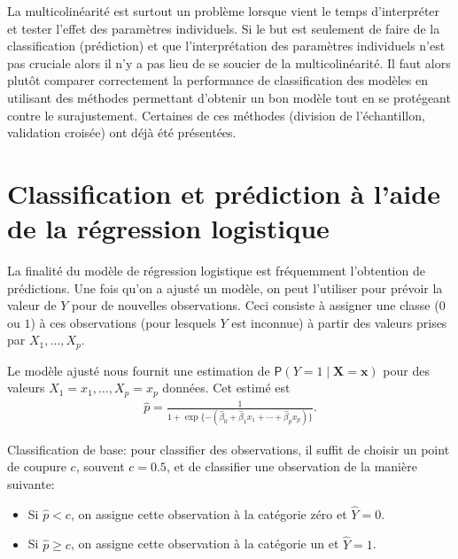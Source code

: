 \documentclass[
  11pt,
  letterpaper,
]{book}
\providecommand{\tightlist}{%
  \setlength{\itemsep}{0pt}\setlength{\parskip}{0pt}}
\theoremstyle{definition}
\theoremstyle{definition}
\theoremstyle{definition}
\theoremstyle{definition}
\theoremstyle{remark}
\begin{document}
La multicolinéarité est surtout un problème lorsque vient le temps d'interpréter et tester l'effet des paramètres individuels. Si le but est seulement de faire de la classification (prédiction) et que l'interprétation des paramètres individuels n'est pas cruciale alors il n'y a pas lieu de se soucier de la multicolinéarité. Il faut alors plutôt comparer correctement la performance de classification des modèles en utilisant des méthodes permettant d'obtenir un bon modèle tout en se protégeant contre le surajustement. Certaines de ces méthodes (division de l'échantillon, validation croisée) ont déjà été présentées.

\hypertarget{classification-et-pruxe9diction-uxe0-laide-de-la-ruxe9gression-logistique}{%
\section{Classification et prédiction à l'aide de la régression logistique}\label{classification-et-pruxe9diction-uxe0-laide-de-la-ruxe9gression-logistique}}

La finalité du modèle de régression logistique est fréquemment l'obtention de prédictions. Une fois qu'on a ajusté un modèle, on peut l'utiliser pour prévoir la valeur de \(Y\) pour de nouvelles observations. Ceci consiste à assigner une classe (\(0\) ou \(1\)) à ces observations (pour lesquels \(Y\) est inconnue) à partir des valeurs prises par \(X_1, \ldots, X_p\).

Le modèle ajusté nous fournit une estimation de \({\mathsf P}\left(Y=1 \mid \boldsymbol{X}=\boldsymbol{x}\right)\) pour des valeurs \(X_1=x_1, \ldots, X_p=x_p\) données. Cet estimé est
\begin{align*}
 \widehat{p} = \frac{1}{1+ \exp\{- ( \widehat{\beta}_0 + \widehat{\beta}_1x_1 + \cdots + \widehat{\beta}_p x_p)\}}.
\end{align*}

Classification de base: pour classifier des observations, il suffit de choisir un point de coupure \(c\), souvent \(c=0.5\), et de classifier une observation de la manière suivante:

\begin{itemize}
\tightlist
\item
  Si \(\widehat{p} < c\), on assigne cette observation à la catégorie zéro et \(\widehat{Y}=0\).
\item
  Si \(\widehat{p} \geq c\), on assigne cette observation à la catégorie un et \(\widehat{Y}=1\).
\end{itemize}
\end{document}
